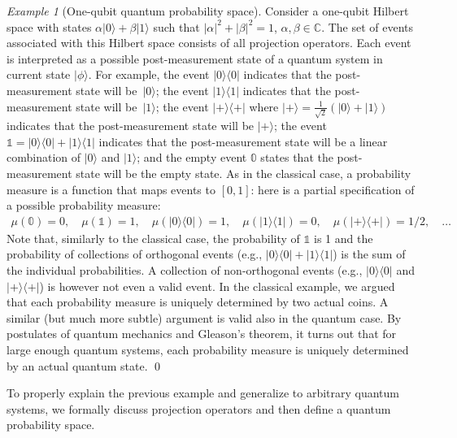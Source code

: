 \documentclass{article}
\theoremstyle{remark}
\newtheorem{example}{Example}
\newcommand{\ket}[1]{|#1\rangle}
\newcommand{\proj}[1]{|#1 \rangle\langle #1 |}
\newcommand{\ps}{\texttt{+}}
\def\C{{\mathbb{C}}}
\begin{document}
\begin{example}[One-qubit quantum probability space] 
  Consider a one-qubit Hilbert space with states
  $\alpha \ket{0} + \beta \ket{1}$ such that
  $|\alpha|^2 + |\beta|^2 = 1$, $\alpha ,\beta \in \C$. The set of events
  associated with this Hilbert space consists of all projection operators. Each event is
  interpreted as a possible post-measurement state of a quantum system
  in current state $\ket{\phi}$. For example, the event $\proj{0}$
  indicates that the post-measurement state will be~$\ket{0}$; the
  event $\proj{1}$ indicates that the post-measurement state will
  be~$\ket{1}$; the event $\proj{\ps}$ where
  $\ket{\ps} = \frac{1}{\sqrt{2}}(\ket{0}+\ket{1})$ indicates that the
  post-measurement state will be $\ket{\ps}$; the event
  $\mathbb{1} = \proj{0}+\proj{1}$ indicates that the post-measurement
  state will be a linear combination of $\ket{0}$ and $\ket{1}$; and
  the empty event $\mathbb{0}$ states that the post-measurement state
  will be the empty state. As in the classical case, a probability
  measure is a function that maps events to $[0,1]$: here is a partial
  specification of a possible probability measure:
\[\begin{array}{rcl}
\mu\left(\mathbb{0}\right) = 0, \quad
\mu\left(\mathbb{1}\right) =  1, \quad
\mu\left(\proj{0}\right) = 1, \quad
\mu\left(\proj{1}\right) = 0, \quad
\mu\left(\proj{\ps}\right) = 1/2, \quad \ldots
\end{array}\]
Note that, similarly to the classical case, the probability of
$\mathbb{1}$ is 1 and the probability of collections of orthogonal
events (e.g., $\proj{0}+\proj{1}$) is the sum of the individual
probabilities. A collection of non-orthogonal events
(e.g., $\proj{0}$ and $\proj{\ps}$) is however not even a valid event.
In the classical example, we argued that each probability measure is
uniquely determined by two actual coins. A similar (but much more
subtle) argument is valid also in the quantum case. By postulates of
quantum mechanics and Gleason's theorem, it turns out that for large
enough quantum systems, each probability measure is uniquely
determined by an actual quantum state.
\qed\end{example}

To properly explain the previous example and generalize to arbitrary
quantum systems, we formally discuss projection operators and then
define a quantum probability space. 
\end{document}
